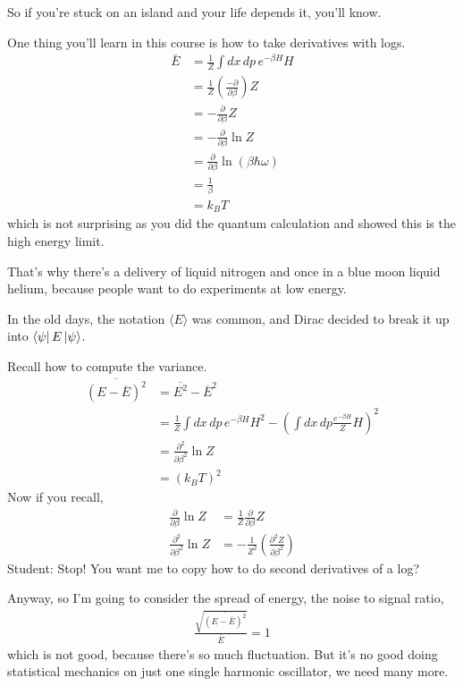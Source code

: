 So if you're stuck on an island and your life depends it,
you'll know.

One thing you'll learn in this course is how to take derivatives with logs.
\begin{align}
    \bar{E} &=
    \frac{1}{Z} \int dx\,dp\,
    e^{-\beta H} H\\
    &=
    \frac{1}{Z}\left( \frac{-\partial}{\partial\beta} \right)Z\\
    &=
    -\frac{\partial}{\partial \beta}Z\\
    &= -\frac{\partial}{\partial\beta}\ln Z\\
    &=
    \frac{\partial}{\partial\beta} \ln(\beta\hbar\omega)\\
    &=
    \frac{1}{\beta}\\
    &= k_B T
\end{align}
which is not surprising as you did the quantum calculation
and showed this is the high energy limit.

That's why there's a delivery of liquid nitrogen and once in a blue moon liquid
helium,
because people want to do experiments at low energy.


In the old days, the notation $\langle E\rangle$ was common,
and Dirac decided to break it up into $\bra{\psi}E\ket{\psi}$.

Recall how to compute the variance.
\begin{align}
    \overline{(E - \overline{E})^2}
    &=
    \overline{E^2} - \overline{E}^2\\
    &=
    \frac{1}{Z} \int dx\,dp\,
    e^{-\beta H} H^2
    -\left( 
        \int dx\, dp
        \frac{e^{-\beta H}}{Z} H
    \right)^2\\
    &= \frac{\partial^2}{\partial\beta^2} \ln Z\\
    &= \left( k_B T \right)^2
\end{align}
Now if you recall,
\begin{align}
    \frac{\partial}{\partial\beta} \ln Z
    &=
    \frac{1}{Z} \frac{\partial}{\partial\beta} Z\\
    \frac{\partial^2}{\partial\beta^2} \ln Z &=
    - \frac{1}{Z^2}\left( \frac{\partial^2 Z}{\partial \beta^2} \right)
\end{align}
Student: Stop!
You want me to copy how to do second derivatives of a log?

Anyway,
so I'm going to consider the spread of energy,
the noise to signal ratio,
\begin{align}
    \frac{\sqrt{\overline{(E - \overbar{E})^2}}}{\bar{E}} = 1
\end{align}
which is not good,
because there's so much fluctuation.
But it's no good doing statistical mechanics on just one single harmonic
oscillator,
we need many more.

